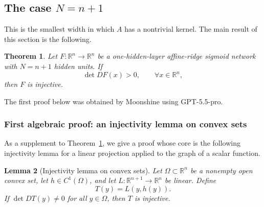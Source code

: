 \documentclass[a4paper,11pt]{article}
\theoremstyle{plain}
\newtheorem{theorem}{Theorem}[section]
\newtheorem{lemma}[theorem]{Lemma}
\theoremstyle{definition}
\theoremstyle{remark}
\begin{document}
\subsection{The case \texorpdfstring{\(N=n+1\)}{N=n+1}}

This is the smallest width in which \(A\) has a nontrivial kernel. The main result of this section is the following.

\begin{theorem}\label{thm:Nnplus1}
Let \(F:\mathbb R^n\to\mathbb R^n\) be a one-hidden-layer affine-ridge sigmoid network with \(N=n+1\) hidden units. If
\[
\det DF(x)>0,
\qquad \forall x\in\mathbb R^n,
\]
then \(F\) is injective.
\end{theorem}

The first proof below was obtained by Moonshine using GPT-5.5-pro.

\subsubsection{First algebraic proof: an injectivity lemma on convex sets}

As a supplement to Theorem~\ref{thm:Nnplus1}, we give a proof whose core is the following injectivity lemma for a linear projection applied to the graph of a scalar function.

\begin{lemma}[Injectivity lemma on convex sets]\label{lem:convex-inj}
Let \(\Omega\subset\mathbb R^n\) be a nonempty open convex set, let \(h\in C^1(\Omega)\), and let \(L:\mathbb R^{n+1}\to\mathbb R^n\) be linear. Define
\[
T(y)=L(y,h(y)).
\]
If \(\det DT(y)\ne0\) for all \(y\in\Omega\), then \(T\) is injective.
\end{lemma}
\end{document}
